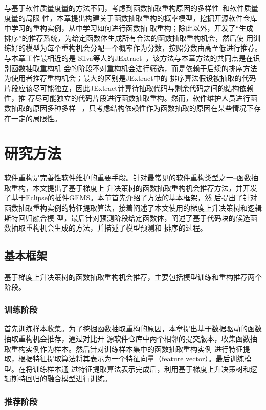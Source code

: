 与基于软件质量度量的方法不同，考虑到函数抽取重构原因的多样性~\cite{silva2016we}和软件质量度量的局限
性，本章提出构建关于函数抽取重构的概率模型，挖掘开源软件仓库中学习的重构实例，从中学习如何进行函数抽
取重构；除此以外，开发了``生成-排序''的推荐系统，为给定函数体生成所有合法的函数抽取重构机会，然后使
用训练好的模型为每个重构机会分配一个概率作为分数，按照分数由高至低进行推荐。与本章工作最相近的是
Silva等人的JExtract~\cite{silva:ICPC14,silva:CoRR15}，该方法与本章方法的共同点是在识别函数抽取重构机
会的阶段不对重构机会进行筛选，而是依赖于后续的排序方法为使用者推荐重构机会；最大的区别是JExtract中的
排序算法假设被抽取的代码片段应该尽可能独立，因此JExtract计算待抽取代码与剩余代码之间的结构依赖性，推
荐尽可能独立的代码片段进行函数抽取重构。然而，软件维护人员进行函数抽取的原因多种多样
~\cite{silva2016we}，只考虑结构依赖性作为函数抽取的原因在某些情况下存在一定的局限性。

\section{研究方法}
软件重构是完善性软件维护的重要手段。针对最常见的软件重构类型之一--函数抽取重构，本文提出了基于梯度上
升决策树的函数抽取重构机会推荐方法，并开发了基于Eclipse的插件GEMS。本节首先介绍了方法的基本框架，然
后提出了针对函数抽取重构实例的特征提取算法，接着阐述了本文使用的梯度上升决策树和逻辑斯特回归融合模
型，最后针对预测阶段给定函数体，阐述了基于代码块的候选函数抽取重构机会生成的方法，并描述了模型预测和
排序的过程。

\subsection{基本框架}
基于梯度上升决策树的函数抽取重构机会推荐，主要包括模型训练和重构推荐两个阶段。

\subsubsection{训练阶段}

首先训练样本收集。为了挖掘函数抽取重构的原因，本章提出基于数据驱动的函数抽取重构机会推荐，通过对比开
源软件仓库中两个相邻的提交版本，收集函数抽取重构实例作为样本。然后针对训练样本集中的函数抽取重构实例
进行特征提取，根据特征提取算法将其表示为一个特征向量（feature vector）。最后训练模型。在将训练样本通
过特征提取算法表示完成后，利用基于梯度上升决策树和逻辑斯特回归的融合模型进行训练。


\subsubsection{推荐阶段}

